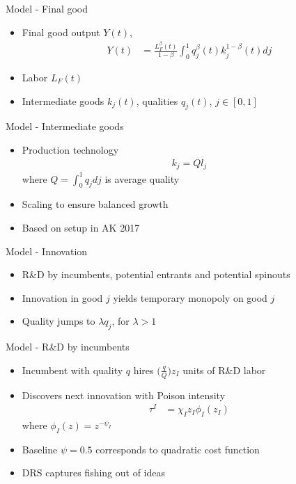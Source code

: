 \documentclass[english,usenames,dvipsnames]{beamer}
\begin{document}
\begin{frame}{Model - Final good}
\begin{itemize}
	\item Final good output $Y(t)$,
	\begin{align*}
		Y(t) &= \frac{L_F^{\beta}(t)}{1-\beta} \int_0^1 q_j^{\beta}(t) k_j^{1-\beta} (t) dj 
	\end{align*}
	\item Labor $L_F(t)$
	\item Intermediate goods $k_j(t)$, qualities $q_j(t)$, $j \in [0,1]$
\end{itemize}
\end{frame}

\begin{frame}{Model - Intermediate goods}
\begin{itemize}
	\item Production technology
	\begin{align*}
		k_j = Q l_j
	\end{align*}
	where $Q = \int_0^1 q_j dj$ is average quality
	\item Scaling to ensure balanced growth
	\item Based on setup in AK 2017
\end{itemize}
\end{frame}

\begin{frame}{Model - Innovation}
\begin{itemize}
	\item R\&D by incumbents, potential entrants and potential spinouts 
	\item Innovation in good $j$ yields temporary monopoly on good $j$
	\item Quality jumps to $\lambda q_j$, for $\lambda > 1$
\end{itemize}
\end{frame}

\begin{frame}{Model - R\&D by incumbents}
\begin{itemize}
	\item Incumbent with quality $q$ hires $\big(\frac{q}{Q}\big)z_I$ units of R\&D labor
	\item Discovers next innovation with Poison intensity
	\begin{align*}
		\tau^I &= \chi_I z_I \phi_I(z_I) 
	\end{align*}
	where $\phi_I(z) = z^{-\psi_I}$
	\item Baseline $\psi = 0.5$ corresponds to quadratic cost function
	\item DRS captures \alert{fishing out} of ideas
\end{itemize}
\end{frame}
\end{document}
